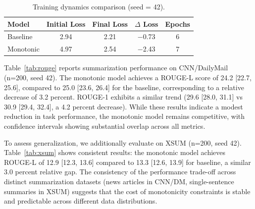 \documentclass{article}
\theoremstyle{plain}
\theoremstyle{definition}
\theoremstyle{remark}
\begin{document}
\begin{table}[t]
\caption{Training dynamics comparison (seed = 42).}
\label{tab:training}
\vskip 0.1in
\begin{center}
\begin{small}
\begin{tabular}{lcccc}
\toprule
Model & Initial Loss & Final Loss & $\Delta$ Loss & Epochs \\
\midrule
Baseline  & 2.94 & 2.21 & $-$0.73 & 6 \\
Monotonic & 4.97 & 2.54 & $-$2.43 & 7 \\
\bottomrule
\end{tabular}
\end{small}
\end{center}
\vskip -0.1in
\end{table}

Table~\ref{tab:rouge} reports summarization performance on CNN/DailyMail (n=200, seed 42). The monotonic model achieves a ROUGE-L score of 24.2 [22.7, 25.6], compared to 25.0 [23.6, 26.4] for the baseline, corresponding to a relative decrease of 3.2 percent. ROUGE-1 exhibits a similar trend (29.6 [28.0, 31.1] vs 30.9 [29.4, 32.4], a 4.2 percent decrease). While these results indicate a modest reduction in task performance, the monotonic model remains competitive, with confidence intervals showing substantial overlap across all metrics.

To assess generalization, we additionally evaluate on XSUM (n=200, seed 42). Table~\ref{tab:xsum} shows consistent results: the monotonic model achieves ROUGE-L of 12.9 [12.3, 13.6] compared to 13.3 [12.6, 13.9] for baseline, a similar 3.0 percent relative gap. The consistency of the performance trade-off across distinct summarization datasets (news articles in CNN/DM, single-sentence summaries in XSUM) suggests that the cost of monotonicity constraints is stable and predictable across different data distributions.

\begin{table}[t]
\caption{Summarization quality on CNN/DailyMail (n = 200, seed = 42). Values are means with 95\% bootstrap confidence intervals.}
\label{tab:rouge}
\vskip 0.1in
\centering
{}
\vskip -0.1in
\end{table}
\end{document}
